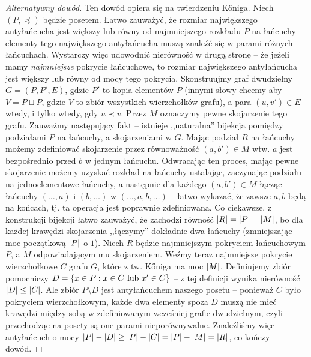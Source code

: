 \begin{proof}[Alternatywny dowód]
	Ten dowód opiera się na twierdzeniu K\H{o}niga. Niech \((P, \preceq)\) będzie posetem. Łatwo zauważyć, że rozmiar największego antyłańcucha jest
	większy lub równy od najmniejszego rozkładu \(P\) na łańcuchy -- elementy tego największego antyłańcucha muszą znaleźć się w parami różnych łańcuchach.
	Wystarczy więc udowodnić nierówność w drugą stronę -- że jeżeli mamy \textit{najmniejsze} pokrycie łańcuchowe, to rozmiar największego antyłańcucha jest
	większy lub równy od mocy tego pokrycia.
	Skonstruujmy graf dwudzielny \(G = (P, P', E)\), gdzie \(P'\) to kopia elementów \(P\) (innymi słowy chcemy aby \(V = P \sqcup P\), gdzie \(V\) to zbiór wszystkich wierzchołków grafu),
	a para \((u, v') \in E\) wtedy, i tylko wtedy, gdy \(u \prec v\). Przez \(M\) oznaczymy pewne skojarzenie tego grafu. Zauważmy następujący fakt --
	istnieje ,,naturalna'' bijekcja pomiędzy podziałami \(P\) na łańcuchy, a skojarzeniami w \(G\). Mając podział \(R\) na łańcuchy możemy zdefiniować skojarzenie
	przez równoważność \((a, b') \in M\) wtw. \(a\) jest bezpośrednio przed \(b\) w jednym łańcuchu. Odwracając ten proces, mając pewne skojarzenie
	możemy uzyskać rozkład na łańcuchy ustalając, zaczynając podziału na jednoelementowe łańcuchy, a następnie dla każdego \((a, b') \in M\)
	łącząc łańcuchy \((\ldots, a)\) i \((b, \ldots)\) w \((\ldots, a, b, \ldots)\) -- łatwo wykazać, że zawsze \(a, b\) będą na końcach, tj. ta operacja jest poprawnie zdefiniowana.
	Co ciekawsze, z konstrukcji bijekcji łatwo zauważyć, że zachodzi równość \(\card{R} = \card{P} - \card{M}\), bo dla każdej krawędzi skojarzenia ,,łączymy'' dokładnie dwa łańcuchy (zmniejszając moc początkową \(\card{P}\) o \(1\)).
	Niech \(R\) będzie najmniejszym pokryciem łańcuchowym \(P\), a \(M\) odpowiadającym mu skojarzeniem. Weźmy teraz najmniejsze pokrycie wierzchołkowe \(C\) grafu \(G\), które z tw. K\H{o}niga ma moc \(\card{M}\).
	Definiujemy zbiór pomocniczy \(D = \set{x \in P : x \in C \text{ lub } x' \in C}\) -- z tej definicji wynika nierówność \(\card{D} \leq \card{C}\).
	Ale zbiór \(P \setminus D\) jest antyłańcuchem naszego posetu -- ponieważ \(C\) było pokryciem wierzchołkowym, każde dwa elementy spoza \(D\) muszą
	nie mieć krawędzi między sobą w zdefiniowanym wcześniej grafie dwudzielnym, czyli przechodząc na posety są one parami nieporównywalne.
	Znaleźliśmy więc antyłańcuch o mocy \(\card{P} - \card{D} \geq \card{P} - \card{C} = \card{P} - \card{M} = \card{R}\), co kończy dowód.
\end{proof}

